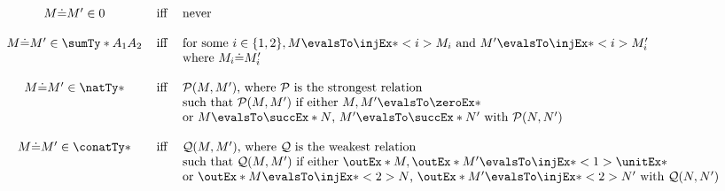 \documentclass[letterpaper]{article}
\begin{document}
\begin{definition}
    $$
  \begin{array}{cll}
      M \dot{=} M' \in 0 & \Iff & \text{never} \\
      \\
      M \dot{=} M' \in \sumTy*{A_1}{A_2} & \Iff & \text{for some } i \in \{1, 2\}, M \evalsTo \injEx*<i>{M_i} \text{ and } M' \evalsTo \injEx*<i>{M'_i} \\
      & & \text{where $M_i \dot{=} M'_i$} \\
      \\
      M \dot{=} M' \in \natTy* & \Iff & \text{$\mathcal P(M, M')$, where $\mathcal P$ is the strongest relation} \\
      & & \text{such that $\mathcal P(M, M')$ if either $M, M' \evalsTo \zeroEx*$} \\
      & & \text{or $M \evalsTo \succEx*{N}$, $M' \evalsTo \succEx*{N'}$ with $\mathcal P(N, N')$} \\
      \\
      M \dot{=} M' \in \conatTy* & \Iff & \text{$\mathcal Q(M, M')$, where $\mathcal Q$ is the weakest relation} \\
      & & \text{such that $\mathcal Q(M, M')$ if either $\outEx*{M}, \outEx*{M'} \evalsTo \injEx*<1>{\unitEx*}$} \\
      & & \text{or $\outEx*{M} \evalsTo \injEx*<2>{N}$, $\outEx*{M'} \evalsTo \injEx*<2>{N'}$ with $\mathcal Q(N, N')$} \\
  \end{array}
  $$
\end{definition}
\end{document}
